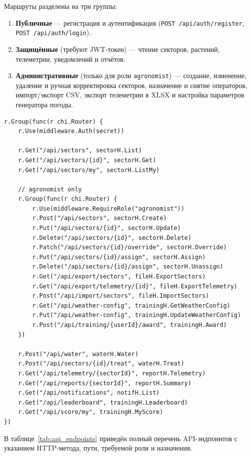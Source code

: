 Маршруты разделены на три группы:
\begin{enumerate}
    \item \textbf{Публичные} --- регистрация и аутентификация
    (\texttt{POST /api/auth/register}, \texttt{POST /api/auth/login}).
    \item \textbf{Защищённые} (требуют JWT-токен) --- чтение
    секторов, растений, телеметрии, уведомлений и отчётов.
    \item \textbf{Административные} (только для роли
    \texttt{agronomist}) --- создание, изменение, удаление и
    ручная корректировка секторов, назначение и снятие
    операторов, импорт/экспорт CSV, экспорт телеметрии в XLSX
    и настройка параметров генератора погоды.
\end{enumerate}

\begin{lstlisting}[caption={Конфигурация защищённых маршрутов (main.go)}, label={lst:routes}]
r.Group(func(r chi.Router) {
    r.Use(middleware.Auth(secret))

    r.Get("/api/sectors", sectorH.List)
    r.Get("/api/sectors/{id}", sectorH.Get)
    r.Get("/api/sectors/my", sectorH.ListMy)

    // agronomist only
    r.Group(func(r chi.Router) {
        r.Use(middleware.RequireRole("agronomist"))
        r.Post("/api/sectors", sectorH.Create)
        r.Put("/api/sectors/{id}", sectorH.Update)
        r.Delete("/api/sectors/{id}", sectorH.Delete)
        r.Patch("/api/sectors/{id}/override", sectorH.Override)
        r.Put("/api/sectors/{id}/assign", sectorH.Assign)
        r.Delete("/api/sectors/{id}/assign", sectorH.Unassign)
        r.Get("/api/export/sectors", fileH.ExportSectors)
        r.Get("/api/export/telemetry/{id}", fileH.ExportTelemetry)
        r.Post("/api/import/sectors", fileH.ImportSectors)
        r.Get("/api/weather-config", trainingH.GetWeatherConfig)
        r.Put("/api/weather-config", trainingH.UpdateWeatherConfig)
        r.Post("/api/training/{userId}/award", trainingH.Award)
    })

    r.Post("/api/water", waterH.Water)
    r.Post("/api/sectors/{id}/treat", waterH.Treat)
    r.Get("/api/telemetry/{sectorId}", reportH.Telemetry)
    r.Get("/api/reports/{sectorId}", reportH.Summary)
    r.Get("/api/notifications", notifH.List)
    r.Get("/api/leaderboard", trainingH.Leaderboard)
    r.Get("/api/score/my", trainingH.MyScore)
})
\end{lstlisting}

В таблице~\ref{tab:api_endpoints} приведён полный перечень
API-эндпоинтов с указанием HTTP-метода, пути, требуемой роли
и назначения.

